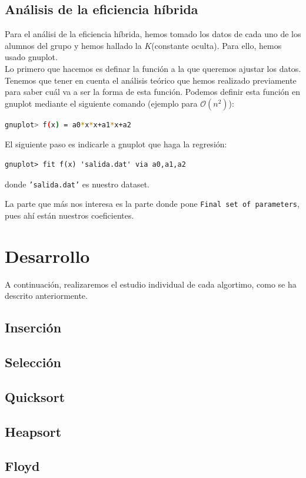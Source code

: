 \documentclass[10pt,a4paper]{article}
\begin{document}
\subsection{Análisis de la eficiencia híbrida}
Para el análisi de la eficiencia híbrida, hemos tomado los datos de cada uno de los alumnos del grupo y hemos hallado la \(K\)(constante oculta). Para ello, hemos usado gnuplot. \\

Lo primero que hacemos es definar la función a la que queremos ajustar los datos. Tenemos que tener en cuenta el análisis teórico que hemos realizado previamente para saber cuál va a ser la forma de esta función. Podemos definir esta función en gnuplot mediante el siguiente comando (ejemplo para \(\mathcal{O}(n^2)\)):
\begin{lstlisting}[language=bash]
gnuplot> f(x) = a0*x*x+a1*x+a2
\end{lstlisting}

El siguiente paso es indicarle a gnuplot que haga la regresión:
\begin{lstlisting}
gnuplot> fit f(x) 'salida.dat' via a0,a1,a2
\end{lstlisting}
donde \texttt{'salida.dat'} es nuestro dataset. 

La parte que más nos interesa es la parte donde pone \texttt{Final set of parameters}, pues ahí están nuestros coeficientes.

\section{Desarrollo}

A continuación, realizaremos el estudio individual de cada algortimo, como se ha descrito anteriormente.

\subsection{Inserción}
\subsection{Selección}
\subsection{Quicksort}
\subsection{Heapsort}
\subsection{Floyd}

\end{document}
